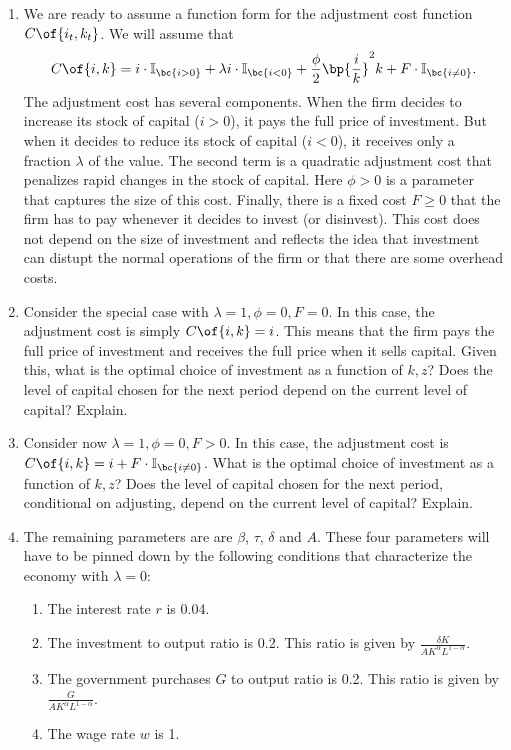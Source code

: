 \documentclass[english,hyperref={pdftex,pdfpagemode=UseNone,hidelinks}]{tufte-handout}
\begin{document}
\begin{enumerate}
    \item We are ready to assume a function form for the adjustment cost function $C\of{i_{t},k_{t}}$. We will assume that \begin{align*}
        C\of{i,k} =  i \cdot \mathbb{I}_{\bc{i >  0}} + \lambda 
        i \cdot \mathbb{I}_{\bc{i < 0}}  + \frac{\phi}{2} \bp{\frac{i}{k}}^2 k + F \cdot \mathbb{I}_{\bc{i \neq 0}}. 
    \end{align*} 
    The adjustment cost has several components. When the firm decides to increase its stock of capital ($i > 0$), it pays the full price of investment. But when it decides to reduce its stock of capital ($i < 0$), it receives only a fraction $\lambda$ of the value. 
     The second term is a quadratic adjustment cost that penalizes rapid changes in the stock of capital. Here $\phi > 0$ is a parameter that captures the size of this cost. Finally, there is a fixed cost $F \geq 0$ that the firm has to pay whenever it decides to invest (or disinvest). This cost does not depend on the size of investment and reflects the idea that investment can distupt the normal operations of the firm or that there are some overhead costs. 

    \item Consider the special case with $\lambda = 1, \phi = 0, F = 0$. In this case, the adjustment cost is simply $C\of{i,k} = i$. This means that the firm pays the full price of investment and receives the full price when it sells capital. Given this, what is the optimal choice of investment as a function of $k,z$? Does the level of capital chosen for the next period depend on the current level of capital? Explain. 
    \item Consider now $\lambda = 1, \phi = 0, F > 0$. In this case, the adjustment cost is $C\of{i,k} = i + F \cdot \mathbb{I}_{\bc{i \neq 0}}$. What is the optimal choice of investment as a function of $k,z$? Does the level of capital chosen for the next period, conditional on adjusting, depend on the current level of capital? Explain. 
     

    \item The remaining parameters are are $\beta$, $\tau$, $\delta$ and $A$. These four parameters will have to be pinned down by the following conditions that characterize the economy with $\lambda = 0$: 
    \begin{enumerate}
        \item The interest rate $r$ is 0.04.
        \item The investment to output ratio is 0.2. This ratio is given by $\frac{\delta K}{A K^\alpha L^{1-\alpha}}$. 
        \item The government purchases  $G$ to output ratio is 0.2. This ratio is given by $\frac{G}{A K^\alpha L^{1-\alpha}}$.
        \item The wage rate $w$ is 1.
    \end{enumerate}
\end{enumerate}
\end{document}
